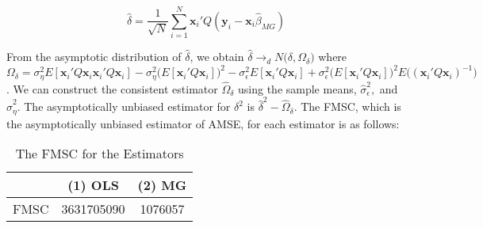 \[
\widehat{\delta} = \frac{1}{\sqrt{N}} \sum_{i=1}^N \mathbf{x}_i'Q(\mathbf{y}_i - \mathbf{x}_i \widehat{\beta}_{MG})
\]

From the asymptotic distribution of $\widehat{\delta}$, we obtain $\widehat{\delta} \rightarrow_d N\big(\delta , \Omega_\delta\big)$ where $\Omega_\delta = \sigma_\eta^2 E[\mathbf{x}_i'Q \mathbf{x}_i \mathbf{x}_i'Q\mathbf{x}_i] - \sigma_\eta^2 \big(E[\mathbf{x}_i'Q\mathbf{x}_i]\big)^2 - \sigma_\epsilon^2 E[\mathbf{x}_i'Q\mathbf{x}_i] + \sigma_\epsilon^2 \big(E[\mathbf{x}_i'Q\mathbf{x}_i]\big)^2 E\big((\mathbf{x}_i'Q\mathbf{x}_i)^{-1}\big)$. We can construct the consistent estimator $\widehat{\Omega}_\delta$ using the sample means, $\widehat{\sigma}_\epsilon^2,$ and $\widehat{\sigma}_\eta^2$. The asymptotically unbiased estimator for $\delta^2$ is $\widehat{\delta}^2 - \widehat{\Omega}_\delta$. The FMSC, which is the asymptotically unbiased estimator of AMSE, for each estimator is as follows:

\begin{table}[htbp]\centering
\caption{The FMSC for the Estimators}
\begin{tabular}{l  c c  }
\hline
\hline
& (1) OLS & (2) MG\\ \hline
FMSC &  3631705090 & 1076057\\

\hline
\hline
\end{tabular}
\end{table}


